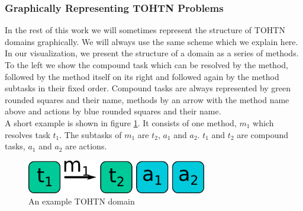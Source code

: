 \subsubsection{Graphically Representing TOHTN Problems}
\label{prelim: graphic tohtn}
In the rest of this work we will sometimes represent the structure of TOHTN domains graphically. We will always use the same scheme which we explain here. In our visualization, we present the structure of a domain as a series of methods. To the left we show the compound task which can be resolved by the method, followed by the method itself on its right and followed again by the method subtasks in their fixed order. Compound tasks are always represented by green rounded squares and their name, methods by an arrow with the method name above and actions by blue rounded squares and their name.\\
A short example is shown in figure \ref{figure: prelim tohtn example}. It consists of one method, $m_1$ which resolves task $t_1$. The subtasks of $m_1$ are $t_2$, $a_1$ and $a_2$. $t_1$ and $t_2$ are compound tasks, $a_1$ and $a_2$ are actions.
\begin{figure}
	\caption{An example TOHTN domain}
	\label{figure: prelim tohtn example}
	\centering
	\includegraphics[width=0.7\textwidth]{images/final/domain_example}
\end{figure}
